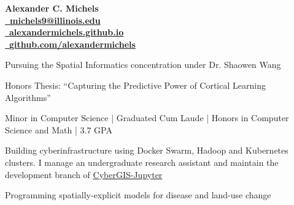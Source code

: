 \documentclass{acmresume}
\begin{document}
	
	\begin{multicols}{2}
		\vspace*{.1cm}
		\textbf{\Huge Alexander C. Michels}\\ \columnbreak
        \hfill\href{mailto:alexandercm4297@gmail.com}{\textbf{\faEnvelope~michels9@illinois.edu}} \\
        \hfill\href{http://alexandermichels.github.io}{\faGlobeAmericas~\textbf{alexandermichels.github.io}} \\
        \hfill\href{https://github.com/alexandermichels}{\faGithub~\textbf{github.com/alexandermichels}}
	\end{multicols}
	
	
		\begin{titemize}
			\item{Pursuing the Spatial Informatics concentration under Dr. Shaowen Wang}
		\end{titemize}

        \begin{titemize}
            \item Honors Thesis: ``Capturing the Predictive Power of Cortical Learning Algorithms''
            \item{Minor in Computer Science | Graduated Cum Laude | Honors in Computer Science and Math | 3.7 GPA}
        \end{titemize}
	
	
        \begin{titemize}
            \item Building cyberinfrastructure using Docker Swarm, Hadoop and Kubernetes clusters. I manage an undergraduate research assistant and maintain the development branch of \hyperlink{https://cybergis.illinois.edu/project/cybergis-jupyter/}{CyberGIS-Jupyter}
            \item Programming spatially-explicit models for disease and land-use change
        \end{titemize}
		
\end{document}
